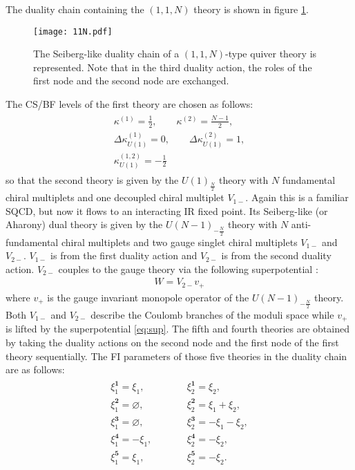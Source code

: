\documentclass[a4paper,11pt]{article}
\begin{document}
The duality chain containing the $(1,1,N)$ theory is shown in figure \ref{fig:11N}.
%
\begin{figure}[tbp]
\centering %
\texttt{[image: 11N.pdf]}
\caption{\label{fig:11N} The Seiberg-like duality chain of a $(1,1,N)$-type quiver theory is represented. Note that in the third duality action, the roles of the first node and the second node are exchanged.}
\end{figure}
%
The CS/BF levels of the first theory are chosen as follows:
\begin{gather}
\begin{gathered}
\label{eq:11N CS}
\kappa^{(1)} = \frac{1}{2}, \qquad \kappa^{(2)} = \frac{N-1}{2}, \\
\Delta \kappa_{U(1)}^{(1)} = 0, \qquad \Delta \kappa_{U(1)}^{(2)} = 1, \\
\kappa_{U(1)}^{(1,2)} = -\frac{1}{2}
\end{gathered}
\end{gather}
so that the second theory is given by the $U(1)_{\frac{N}{2}}$ theory with $N$ fundamental chiral multiplets and one decoupled chiral multiplet $V_{1-}$. Again this is a familiar SQCD, but now it flows to an interacting IR fixed point. Its Seiberg-like (or Aharony) dual theory is given by the $U(N-1)_{-\frac{N}{2}}$ theory with $N$ anti-fundamental chiral multiplets and two gauge singlet chiral multiplets $V_{1-}$ and $V_{2-}$. $V_{1-}$ is from the first duality action and $V_{2-}$ is from the second duality action. $V_{2-}$ couples to the gauge theory via the following superpotential \cite{Aharony:1997gp,Benini:2011mf}:
\begin{align}
\label{eq:sup}
W = V_{2-} v_+
\end{align}
where $v_+$ is the gauge invariant monopole operator of the $U(N-1)_{-\frac{N}{2}}$ theory. Both $V_{1-}$ and $V_{2-}$ describe the Coulomb branches of the moduli space while $v_+$ is lifted by the superpotential \eqref{eq:sup}. The fifth and fourth theories are obtained by taking the duality actions on the second node and the first node of the first theory sequentially. The FI parameters of those five theories in the duality chain are as follows:
\begin{align}
\label{eq:11N FI}
\begin{array}{lll}
\xi^{\mathbf 1}_1 = \xi_1, &\qquad& \xi^{\mathbf 1}_2 = \xi_2, \\
\xi^{\mathbf 2}_1 = \varnothing, &\qquad& \xi^{\mathbf 2}_2 = \xi_1+\xi_2, \\
\xi^{\mathbf 3}_1 = \varnothing, &\qquad& \xi^{\mathbf 3}_2 = -\xi_1-\xi_2, \\
\xi^{\mathbf 4}_1 = -\xi_1, &\qquad& \xi^{\mathbf 4}_2 = -\xi_2, \\
\xi^{\mathbf 5}_1 = \xi_1, &\qquad& \xi^{\mathbf 5}_2 = -\xi_2.
\end{array}
\end{align}
\\
\end{document}
